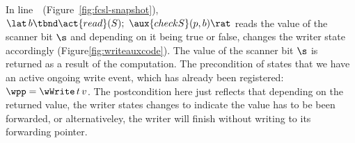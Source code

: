 
In line~\lineWrtChk~(Figure~\ref{fig:fcsl-snapshot}), $ \lat\, b \tbnd
\act{read}(S);\ \aux{checkS}(p,b) \rat$ reads the value of the scanner
bit $\s$ and depending on it being true or false,  changes
the writer state accordingly (Figure\ref{fig:writeauxcode}). The value
of the scanner bit $\s$ is returned as a result of the
computation. The precondition of  states that we have an
active ongoing write event, which has already been registered: $ \wpp
= \wWrite\, t\, v $. The postcondition here just reflects that
depending on the returned value, the writer states changes to indicate
the value has to be been forwarded, or alternativeley, the writer will
finish without writing to its forwarding pointer.


